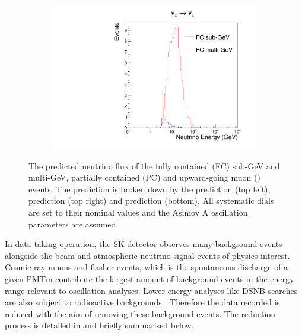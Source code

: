 \begin{figure}[h]
\begin{subfigure}[t]{0.49\textwidth}
    \includegraphics[width=\textwidth, trim={0mm 0mm 0mm 0mm}, clip,page=1]{Figures/Selections/NeutrinoEnergyDist_NuTau.pdf}
  \end{subfigure}%
  \caption{The predicted neutrino flux of the fully contained (FC) sub-GeV and multi-GeV, partially contained (PC) and upward-going muon () events. The prediction is broken down by the  prediction (top left),  prediction (top right) and  prediction (bottom). All systematic dials are set to their nominal values and the Asimov A oscillation parameters are assumed.}
  \label{fig:Selection_NeutrinoEnergyDistribution}
\end{figure}

In data-taking operation, the SK detector observes many background events alongside the beam and atmospheric neutrino signal events of physics interest. Cosmic ray muons and flasher events, which is the spontaneous discharge of a given PMTm contribute the largest amount of background events in the energy range relevant to oscillation analyses. Lower energy analyses like DSNB searches are also subject to radioactive backgrounds \cite{Nakano_2017}. Therefore the data recorded is reduced with the aim of removing these background events. The reduction process is detailed in \cite{Ashie_2005, Jiang2019-iw} and briefly summarised below.

